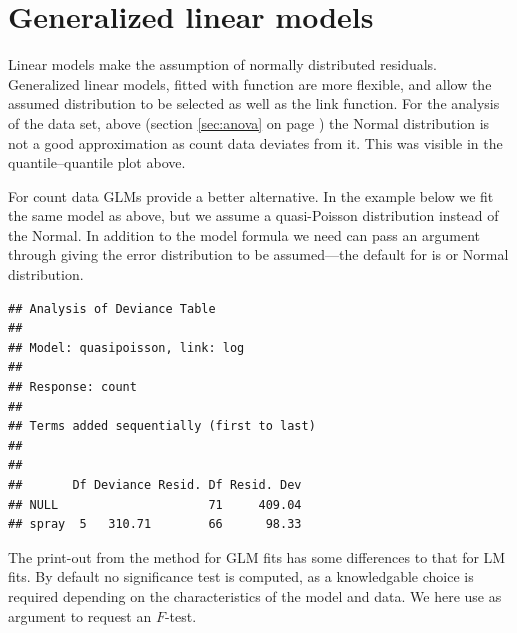 \documentclass[krantz2]{krantz}\usepackage{knitr}%
\begin{document}
\section{Generalized linear models}\label{sec:stat:GLM}

Linear models make the assumption of normally distributed residuals. Generalized linear models, fitted with function  are more flexible, and allow the assumed distribution to be selected as well as the link function.
For the analysis of the  data set, above (section \ref{sec:anova} on page \pageref{sec:anova}) the Normal distribution is not a good approximation as count data deviates from it. This was visible in the quantile--quantile plot above.

For count data GLMs provide a better alternative. In the example below we fit the same model as above, but we assume a quasi-Poisson distribution instead of the Normal. In addition to the model formula we need can pass an argument through  giving the error distribution to be assumed---the default for  is  or Normal distribution.

\begin{knitrout}\footnotesize
{}\color{fgcolor}\begin{kframe}
\begin{alltt}
 \hlkwb{<-}  \hlopt{~}     
\end{alltt}
\begin{verbatim}
## Analysis of Deviance Table
## 
## Model: quasipoisson, link: log
## 
## Response: count
## 
## Terms added sequentially (first to last)
## 
## 
##       Df Deviance Resid. Df Resid. Dev
## NULL                     71     409.04
## spray  5   310.71        66      98.33
\end{verbatim}
\end{kframe}
\end{knitrout}

The print-out from the  method for GLM fits has some differences to that for LM fits. By default no significance test is computed, as a knowledgable choice is required depending on the characteristics of the model and data. We here use  as argument to request an $F$-test.
\end{document}

